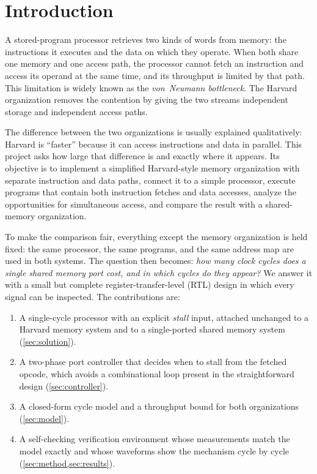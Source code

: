 \documentclass[conference]{IEEEtran}
\begin{document}
\section{Introduction}

A stored-program processor retrieves two kinds of words from memory: the instructions it executes
and the data on which they operate. When both share one memory and one access path, the processor
cannot fetch an instruction and access its operand at the same time, and its throughput is limited
by that path. This limitation is widely known as the \emph{von~Neumann bottleneck}. The Harvard
organization removes the contention by giving the two streams independent storage and independent
access paths.

The difference between the two organizations is usually explained qualitatively: Harvard is
``faster'' because it can access instructions and data in parallel. This project asks how large
that difference is and exactly where it appears. Its objective is to implement a simplified
Harvard-style memory organization with separate instruction and data paths, connect it to a simple
processor, execute programs that contain both instruction fetches and data accesses, analyze the
opportunities for simultaneous access, and compare the result with a shared-memory organization.

To make the comparison fair, everything except the memory organization is held fixed: the same
processor, the same programs, and the same address map are used in both systems. The question
then becomes: \emph{how many clock cycles does a single shared memory port cost, and in which
cycles do they appear?} We answer it with a small but complete register-transfer-level (RTL)
design in which every signal can be inspected. The contributions are:
\begin{enumerate}
  \item A single-cycle processor with an explicit \emph{stall} input, attached unchanged to a
        Harvard memory system and to a single-ported shared memory system
        (\cref{sec:solution}).
  \item A two-phase port controller that decides when to stall from the fetched opcode, which
        avoids a combinational loop present in the straightforward design (\cref{sec:controller}).
  \item A closed-form cycle model and a throughput bound for both organizations
        (\cref{sec:model}).
  \item A self-checking verification environment whose measurements match the model exactly and
        whose waveforms show the mechanism cycle by cycle (\cref{sec:method,sec:results}).
\end{enumerate}
\end{document}
